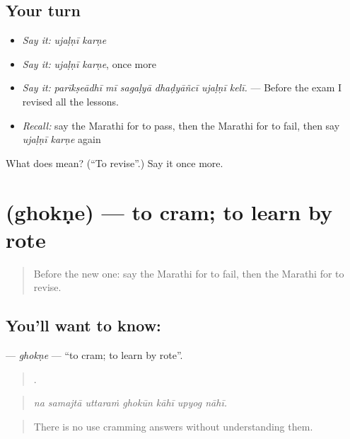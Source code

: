 \subsection*{Your turn}
\begin{itemize}
\raggedright
  \item \emph{Say it:} \emph{ujaḷṇī karṇe}
  \item \emph{Say it:} \emph{ujaḷṇī karṇe}, once more
  \item \emph{Say it:} \emph{parīkṣeādhī mī sagaḷyā dhaḍyāñcī ujaḷṇī kelī.} — Before the exam I revised all the lessons.
  \item \emph{Recall:} say the Marathi for to pass, then the Marathi for to fail, then say \emph{ujaḷṇī karṇe} again
\end{itemize}

\begin{tcolorbox}[breakable,colback=teal!4,colframe=teal!35!black,title={Before you move on}]
What does   mean? (\textquotedblleft{}To revise\textquotedblright{}.) Say it once more.
\end{tcolorbox}
\section[\texorpdfstring{\mr{घोकणे} (ghokṇe)}{घोकणे (ghokṇe)}]{ (ghokṇe) — to cram; to learn by rote}

\label{lesson:MR-C371-ghokne}



\begin{quote}
Before the new one: say the Marathi for to fail, then the Marathi for to revise.
\end{quote}

\subsection*{You'll want to know: }
\textbf{} — \emph{ghokṇe} — \textquotedblleft{}to cram; to learn by rote\textquotedblright{}.

\begin{quote}
      .
\end{quote}

\begin{quote}
\emph{na samajtā uttaraṁ ghokūn kāhī upyog nāhī.}
\end{quote}

\begin{quote}
There is no use cramming answers without understanding them.
\end{quote}

